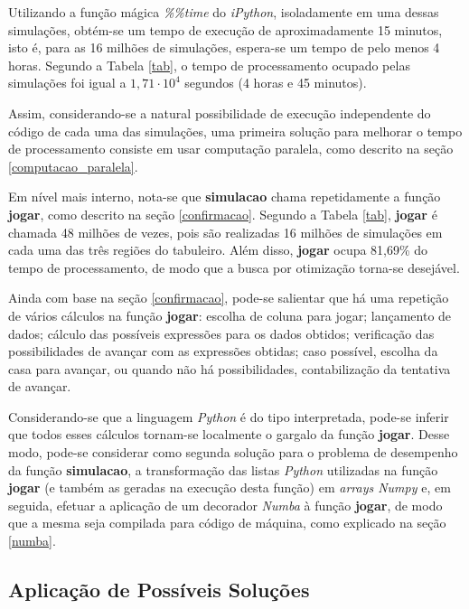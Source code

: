 \documentclass[12pt]{article}
\begin{document}
Utilizando a função mágica \textit{\%\%time} do \textit{iPython}, isoladamente em uma dessas simulações, obtém-se um tempo de execução de aproximadamente 15 minutos, isto é, para as 16 milhões de simulações, espera-se um tempo de pelo menos 4 horas. Segundo a Tabela \ref{tab}, o tempo de processamento ocupado pelas simulações foi igual a $1,71 \cdot 10^4$ segundos (4 horas e 45 minutos). 

Assim, considerando-se a natural possibilidade de execução independente do código de cada uma das simulações, uma primeira solução para melhorar o tempo de processamento consiste em usar computação paralela, como descrito na seção \ref{computacao_paralela}.

Em nível mais interno, nota-se que \textbf{simulacao} chama repetidamente a função \textbf{jogar}, como descrito na seção \ref{confirmacao}. Segundo a Tabela \ref{tab}, \textbf{jogar} é chamada 48 milhões de vezes, pois são realizadas 16 milhões de simulações em cada uma das três regiões do tabuleiro. Além disso, \textbf{jogar} ocupa 81,69\% do tempo de processamento, de modo que a busca por otimização torna-se desejável.

Ainda com base na seção \ref{confirmacao}, pode-se salientar que há uma repetição de vários cálculos na função \textbf{jogar}: escolha de coluna para jogar; lançamento de dados; cálculo das possíveis expressões para os dados obtidos; verificação das possibilidades de avançar com as expressões obtidas; caso possível, escolha da casa para avançar, ou quando não há possibilidades, contabilização da tentativa de avançar.

Considerando-se que a linguagem \textit{Python} é do tipo interpretada, pode-se inferir que todos esses cálculos tornam-se localmente o gargalo da função \textbf{jogar}. Desse modo, pode-se considerar como segunda solução para o problema de desempenho da função \textbf{simulacao}, a transformação das listas \textit{Python} utilizadas na função \textbf{jogar} (e também as geradas na execução desta função) em \textit{arrays Numpy} e, em seguida, efetuar a aplicação de um decorador \textit{Numba} à função \textbf{jogar}, de modo que a mesma seja compilada para código de máquina, como explicado na seção \ref{numba}.

\subsection{Aplicação de Possíveis Soluções}
\label{solucoes}

\end{document}

